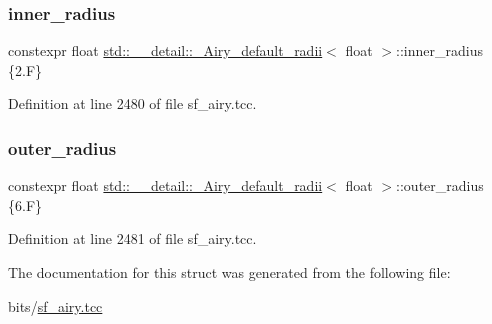 \subsubsection{\texorpdfstring{inner\+\_\+radius}{inner\_radius}}
{\footnotesize\ttfamily constexpr float \hyperlink{structstd_1_1____detail_1_1__Airy__default__radii}{std\+::\+\_\+\+\_\+detail\+::\+\_\+\+Airy\+\_\+default\+\_\+radii}$<$ float $>$\+::inner\+\_\+radius \{2.\+F\}\hspace{0.3cm}{\ttfamily [static]}}



Definition at line 2480 of file sf\+\_\+airy.\+tcc.

\mbox{\label{structstd_1_1____detail_1_1__Airy__default__radii_3_01float_01_4_ad8ea3a344f9748cf9bf32bcc17ca5d0b}} 
\subsubsection{\texorpdfstring{outer\+\_\+radius}{outer\_radius}}
{\footnotesize\ttfamily constexpr float \hyperlink{structstd_1_1____detail_1_1__Airy__default__radii}{std\+::\+\_\+\+\_\+detail\+::\+\_\+\+Airy\+\_\+default\+\_\+radii}$<$ float $>$\+::outer\+\_\+radius \{6.\+F\}\hspace{0.3cm}{\ttfamily [static]}}



Definition at line 2481 of file sf\+\_\+airy.\+tcc.



The documentation for this struct was generated from the following file\+:\begin{DoxyCompactItemize}
\item 
bits/\hyperlink{sf__airy_8tcc}{sf\+\_\+airy.\+tcc}\end{DoxyCompactItemize}
